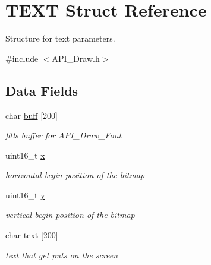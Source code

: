 \hypertarget{struct_t_e_x_t}{}\section{T\+E\+XT Struct Reference}
\label{struct_t_e_x_t}


Structure for text parameters.  




{\ttfamily \#include $<$A\+P\+I\+\_\+\+Draw.\+h$>$}

\subsection*{Data Fields}
\begin{DoxyCompactItemize}
\item 
\mbox{\label{struct_t_e_x_t_a2f784963b0fa863258ed0ac79e9940fb}} 
char \hyperlink{struct_t_e_x_t_a2f784963b0fa863258ed0ac79e9940fb}{buff} \mbox{[}200\mbox{]}
\begin{DoxyCompactList}\small\item\em fills buffer for A\+P\+I\+\_\+\+Draw\+\_\+\+Font \end{DoxyCompactList}\item 
\mbox{\label{struct_t_e_x_t_a4dde988b1b2adba65ae3efa69f65d960}} 
uint16\+\_\+t \hyperlink{struct_t_e_x_t_a4dde988b1b2adba65ae3efa69f65d960}{x}
\begin{DoxyCompactList}\small\item\em horizontal begin position of the bitmap \end{DoxyCompactList}\item 
\mbox{\label{struct_t_e_x_t_ab0580f504a7428539be299fa71565f30}} 
uint16\+\_\+t \hyperlink{struct_t_e_x_t_ab0580f504a7428539be299fa71565f30}{y}
\begin{DoxyCompactList}\small\item\em vertical begin position of the bitmap \end{DoxyCompactList}\item 
\mbox{\label{struct_t_e_x_t_a50cee21aace972bab778fcf9df69a4ae}} 
char \hyperlink{struct_t_e_x_t_a50cee21aace972bab778fcf9df69a4ae}{text} \mbox{[}200\mbox{]}
\begin{DoxyCompactList}\small\item\em text that get puts on the screen \end{DoxyCompactList}\item 

\end{DoxyCompactItemize}
